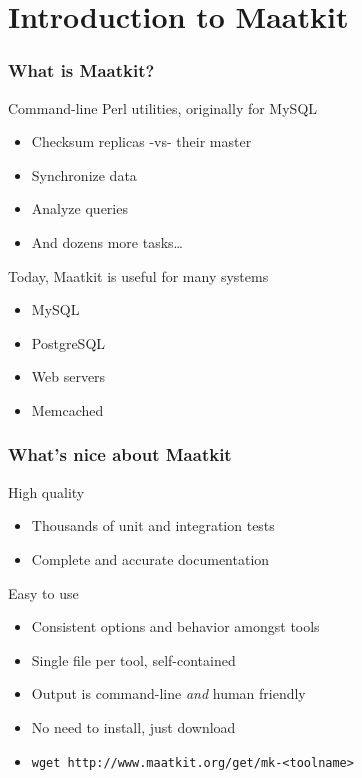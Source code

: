 \section{Introduction to Maatkit}
\begin{frame}
   \frametitle{What is Maatkit?}
   \begin{block}{Command-line Perl utilities, originally for MySQL}
      \begin{itemize}
         \item Checksum replicas -vs- their master
         \item Synchronize data
         \item Analyze queries
         \item And dozens more tasks\dots
      \end{itemize}
   \end{block}
   \pause
   \begin{block}{Today, Maatkit is useful for many systems}
      \begin{itemize}
         \item MySQL
         \item PostgreSQL
         \item Web servers
         \item Memcached
      \end{itemize}
   \end{block}
\end{frame}
\begin{frame}
   \frametitle{What's nice about Maatkit}
   \begin{block}{High quality}
      \begin{itemize}
         \item Thousands of unit and integration tests
         \item Complete and accurate documentation
      \end{itemize}
   \end{block}
   \pause
   \begin{block}{Easy to use}
      \begin{itemize}
         \item Consistent options and behavior amongst tools
         \item Single file per tool, self-contained
         \item Output is command-line \emph{and} human friendly
         \item No need to install, just download
         \item \texttt{wget http://www.maatkit.org/get/mk-<toolname>}
      \end{itemize}
   \end{block}
\end{frame}

